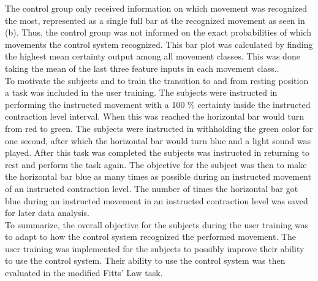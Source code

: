 The control group only received information on which movement was recognized the most, represented as a single full bar at the recognized movement as seen in  (b). Thus, the control group was not informed on the exact probabilities of which movements the control system recognized. This bar plot was calculated by finding the highest mean certainty output among all movement classes. This was done taking the mean of the last three feature inputs in each movement class.. \\
To motivate the subjects and to train the transition to and from resting position a task was included in the user training. The subjects were instructed in performing the instructed movement with a 100 \% certainty inside the instructed contraction level interval. When this was reached the horizontal bar would turn from red to green. The subjects were instructed in withholding the green color for one second, after which the horizontal bar would turn blue and a light sound was played. After this task was completed the subjects was instructed in returning to rest and perform the task again. The objective for the subject was then to make the horizontal bar blue as many times as possible during an instructed movement of an instructed contraction level. The number of times the horizontal bar got blue during an instructed movement in an instructed contraction level was saved for later data analysis. \\

To summarize, the overall objective for the subjects during the user training was to adapt to how the control system recognized the performed movement. The user training was implemented for the subjects to possibly improve their ability to use the control system. Their ability to use the control system was then evaluated in the modified Fitts' Law task. 











 







